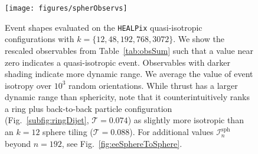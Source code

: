 \documentclass[letterpaper,11pt]{article}
\newcommand{\iso}[2]{\mathcal{I}^\text{#1}_{#2}}
\DeclareRobustCommand{\Tab}[1]{Table~\ref{#1}}
\DeclareRobustCommand{\Fig}[1]{Fig.~\ref{#1}}
\begin{document}
\begin{figure}[t!]
%
\centering
 \texttt{[image: figures/spherObservs]}
%
\caption{Event shapes evaluated on the \texttt{HEALPix} quasi-isotropic configurations with $k=\{12,48,192,768,3072\}$.
%
We show the rescaled observables from \Tab{tab:obsSum} such that a value near zero indicates a quasi-isotropic event.
%
Observables with darker shading indicate more dynamic range.
%
We average the value of event isotropy over $10^3$ random orientations.
%
While thrust has a larger dynamic range than sphericity, note that it counterintuitively ranks a ring plus back-to-back particle configuration (\Fig{subfig:ringDijet}, $\mathcal{T} = 0.074$) as slightly more isotropic than an $k = 12$ sphere tiling ($\mathcal{T} = 0.088$).
%
For additional values $\iso{sph}{n}$ beyond $n = 192$, see \Fig{fig:eeSphereToSphere}.}
%
\label{fig:obsOnSpher}
\end{figure}
\end{document}
